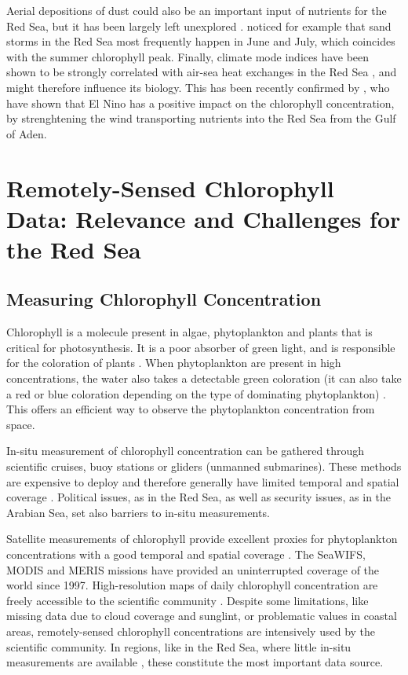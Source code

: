 Aerial depositions of dust could also be an important input of nutrients for
the Red Sea, but it has been largely left unexplored \citep{Triantafyllou2014}.
\citet{Raitsos2013} noticed for example that sand storms in the Red Sea most
frequently happen in June and July, which coincides with the summer chlorophyll
peak. Finally, climate mode indices have been shown to be strongly correlated
with air-sea heat exchanges in the Red Sea \citep{Abualnaja2015}, and might
therefore influence its biology. This has been recently confirmed by
\citet{Raitsos2015}, who have shown that El Nino has a positive impact on the
chlorophyll concentration, by strenghtening the wind transporting nutrients
into the Red Sea from the Gulf of Aden.

\section{Remotely-Sensed Chlorophyll Data: Relevance and Challenges for the Red
Sea}

\subsection{Measuring Chlorophyll Concentration}

Chlorophyll is a molecule present in algae, phytoplankton and plants that is
critical for photosynthesis. It is a poor absorber of green light, and is
responsible for the coloration of plants \citep{Pal2014}. When phytoplankton
are present in high concentrations, the water also takes a detectable green
coloration (it can also take a red or blue coloration depending on the type of
dominating phytoplankton) \citep{Robinson2010}. This offers an efficient way to
observe the phytoplankton concentration from space.

In-situ measurement of chlorophyll concentration can be gathered through
scientific cruises, buoy stations or gliders (unmanned submarines). These
methods are expensive to deploy and therefore generally have limited temporal
and spatial coverage \citep{Robinson2010}. Political issues, as in the Red Sea,
as well as security issues, as in the Arabian Sea, set also barriers to in-situ
measurements.

Satellite measurements of chlorophyll provide excellent proxies for
phytoplankton concentrations with a good temporal and spatial coverage
\citep{Robinson2010}. The SeaWIFS, MODIS and MERIS missions have provided an
uninterrupted coverage of the world since 1997. High-resolution maps of daily
chlorophyll concentration are freely accessible to the scientific community
\citep{McClain2009}. Despite some limitations, like missing data due to cloud
coverage and sunglint, or problematic values in coastal areas, remotely-sensed
chlorophyll concentrations are intensively used by the scientific community. In
regions, like in the Red Sea, where little in-situ measurements are available
\citep{Raitsos2013, Brewin2013}, these constitute the most important data
source.

